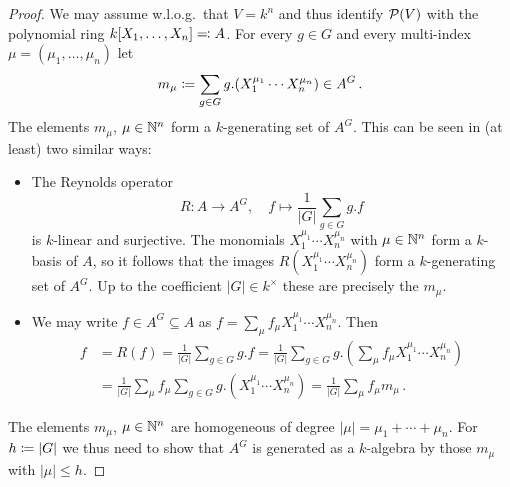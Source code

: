\begin{proof}
  We may assume w.l.o.g.\ that $V = k^n$ and thus identify $\mathcal{P}(V)$ with the polynomial ring $k[X_1, \dotsc, X_n] \eqqcolon A$.
  For every $g \in G$ and every multi-index $\mu = (\mu_1, \dotsc, \mu_n)$ let
  \[
              m_\mu
    \coloneqq  \sum_{g \in G} g.(X_1^{\mu_1} \dotsm X_n^{\mu_n})
    \in       A^G \,.
  \]
  The elements $m_\mu$, $\mu \in \mathbb{N}^n$ form a $k$-generating set of $A^G$.
  This can be seen in (at least) two similar ways:
  \begin{itemize}
    \item
      The Reynolds operator
      \[
                R
        \colon  A
        \to     A^G,
        \quad   f
        \mapsto \frac{1}{|G|} \sum_{g \in G} g.f
      \]
      is $k$-linear and surjective.
      The monomials $X_1^{\mu_1} \dotsm X_n^{\mu_n}$ with $\mu \in \mathbb{N}^n$ form a $k$-basis of $A$, so it follows that the images $R(X_1^{\mu_1} \dotsm X_n^{\mu_n})$ form a $k$-generating set of $A^G$.
      Up to the coefficient $|G| \in k^\times$ these are precisely the $m_\mu$.
    \item
      We may write $f \in A^G \subseteq A$ as $f = \sum_{\mu} f_\mu X_1^{\mu_1} \dotsm X_n^{\mu_n}$.
      Then
      \begin{align*}
            f
        &=  R(f)
         =  \frac{1}{|G|} \sum_{g \in G} g.f
         =  \frac{1}{|G|} \sum_{g \in G} g.\left( \sum_{\mu} f_\mu X_1^{\mu_1} \dotsm X_n^{\mu_n} \right) \\
        &=  \frac{1}{|G|} \sum_{\mu} f_\mu \sum_{g \in G} g.\left( X_1^{\mu_1} \dotsm X_n^{\mu_n} \right)
         =  \frac{1}{|G|} \sum_{\mu} f_\mu m_\mu \,.
      \end{align*}
  \end{itemize}
  The elements $m_\mu$, $\mu \in \mathbb{N}^n$ are homogeneous of degree $|\mu| = \mu_1 + \dotsb + \mu_n$.
  For $h \coloneqq |G|$ we thus need to show that $A^G$ is generated as a $k$-algebra by those $m_\mu$ with $|\mu| \leq h$.
  

\end{proof}
